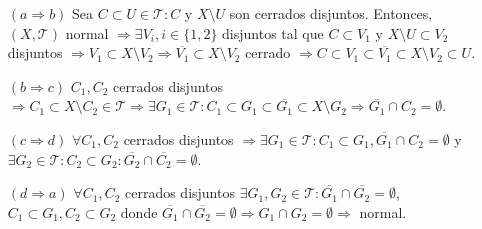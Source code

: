 \begin{dem}
  \begin{enumerate}[label=(\roman*)]
    \item []
    \item [$(a \Rightarrow b)$] Sea $C \subset U \in \mathcal{T}: C$ y $X \setminus U$ son cerrados disjuntos. Entonces, $( X, \mathcal{T} )$ normal $\Rightarrow \exists V_{i}, i \in \{ 1, 2 \}$ disjuntos tal que $C \subset V_{1}$ y $X \setminus U \subset V_{2}$ disjuntos $\Rightarrow V_{1} \subset X \setminus V_{2} \Rightarrow \overline{V_{1}} \subset X \setminus V_{2} $ cerrado $\Rightarrow C \subset V_{1} \subset \overline{V_{1}} \subset X \setminus V_{2} \subset U$.
    \item [$(b \Rightarrow c)$] $C_{1}, C_{2}$ cerrados disjuntos $\Rightarrow C_{1} \subset X \setminus C_{2} \in \mathcal{T} \Rightarrow \exists G_{1} \in \mathcal{T} : C_{1} \subset G_{1} \subset \overline{G_{1}} \subset X \setminus G_{2} \Rightarrow \overline{G_{1}} \cap C_{2} = \emptyset$.
    \item [$(c \Rightarrow d)$] $\forall C_{1}, C_{2}$ cerrados disjuntos $\Rightarrow \exists G_{1} \in \mathcal{T} : C_{1} \subset G_{1}, \overline{G_{1}} \cap C_{2} = \emptyset $ y $ \exists G_{2} \in \mathcal{T} : C_{2} \subset G_{2} : \overline{G_{2}} \cap \overline{C_{2}} = \emptyset$.
    \item [$(d \Rightarrow a)$] $\forall C_{1}, C_{2}$ cerrados disjuntos $\exists G_{1}, G_{2} \in \mathcal{T}: \overline{G_{1}} \cap \overline{G_{2}} = \emptyset$, $C_{1} \subset G_{1}, C_{2} \subset G_{2}$ donde $\overline{G_{1}} \cap \overline{G_{2}} = \emptyset \Rightarrow G_{1} \cap G_{2} = \emptyset \Rightarrow$ normal.
  \end{enumerate}
\end{dem}
